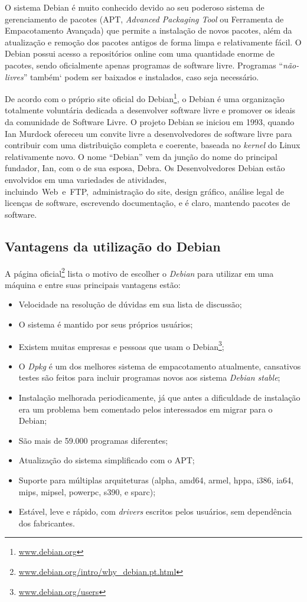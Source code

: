O sistema Debian é muito conhecido devido ao seu poderoso sistema de gerenciamento de pacotes (APT, \textit{Advanced Packaging Tool} ou Ferramenta de Empacotamento Avançada) que permite a instalação de novos pacotes, além da atualização e remoção dos pacotes antigos de forma limpa e relativamente fácil. O Debian possui acesso a repositórios online com uma quantidade enorme de pacotes, sendo oficialmente apenas programas de software livre. Programas ``\textit{não-livres}'' também` podem ser baixados e instalados, caso seja necessário.

De acordo com o próprio site oficial do Debian\footnote{\url{www.debian.org}}, o Debian é uma organização totalmente voluntária dedicada a desenvolver software livre e promover os ideais da comunidade de Software Livre. O projeto Debian se iniciou em 1993, quando Ian Murdock ofereceu um convite livre a desenvolvedores de software livre para contribuir com uma distribuição completa e coerente, baseada no \textit{kernel} do Linux relativamente novo. O nome “Debian” vem da junção do nome do principal fundador, Ian, com o de sua esposa, Debra. Os Desenvolvedores Debian estão envolvidos em uma variedades de atividades, incluindo Web e FTP, administração do site, design gráfico, análise legal de licenças de software, escrevendo documentação, e é claro, mantendo pacotes de software.

\subsection{Vantagens da utilização do Debian}
A página oficial\footnote{\url{www.debian.org/intro/why\_debian.pt.html}} lista o motivo de escolher o \textit{Debian} para utilizar em uma máquina e entre suas principais vantagens estão:

\begin{itemize}
	\item Velocidade na resolução de dúvidas em sua lista de discussão;
	\item O sistema é mantido por seus próprios usuários;
	\item Existem muitas empresas e pessoas que usam o Debian\footnote{\url{www.debian.org/users}};
	\item O \textit{Dpkg} é um dos melhores sistema de empacotamento atualmente, cansativos testes são feitos para incluir programas novos aos sistema \textit{Debian stable};
	\item Instalação melhorada periodicamente, já que antes a dificuldade de instalação era um problema bem comentado pelos interessados em migrar para o Debian;
	\item São mais de 59.000 programas diferentes;
	\item Atualização do sistema simplificado com o APT;
	\item Suporte para múltiplas arquiteturas (alpha, amd64, armel, hppa, i386, ia64, mips, mipsel, powerpc, s390, e sparc);
	\item Estável, leve e rápido, com \textit{drivers} escritos pelos usuários, sem dependência dos fabricantes.
\end{itemize}

